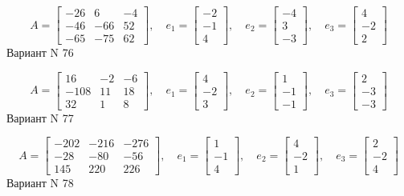 \documentclass[11pt]{report}
\begin{document}
$$A = \left[\begin{matrix}-26 & 6 & -4\\-46 & -66 & 52\\-65 & -75 & 62\end{matrix}\right],\quad e_1 = \left[\begin{matrix}-2\\-1\\4\end{matrix}\right],\quad e_2 = \left[\begin{matrix}-4\\3\\-3\end{matrix}\right],\quad e_3 = \left[\begin{matrix}4\\-2\\2\end{matrix}\right]$$Вариант N 76

$$A = \left[\begin{matrix}16 & -2 & -6\\-108 & 11 & 18\\32 & 1 & 8\end{matrix}\right],\quad e_1 = \left[\begin{matrix}4\\-2\\3\end{matrix}\right],\quad e_2 = \left[\begin{matrix}1\\-1\\-1\end{matrix}\right],\quad e_3 = \left[\begin{matrix}2\\-3\\-3\end{matrix}\right]$$Вариант N 77

$$A = \left[\begin{matrix}-202 & -216 & -276\\-28 & -80 & -56\\145 & 220 & 226\end{matrix}\right],\quad e_1 = \left[\begin{matrix}1\\-1\\4\end{matrix}\right],\quad e_2 = \left[\begin{matrix}4\\-2\\1\end{matrix}\right],\quad e_3 = \left[\begin{matrix}2\\-2\\4\end{matrix}\right]$$Вариант N 78
\end{document}
